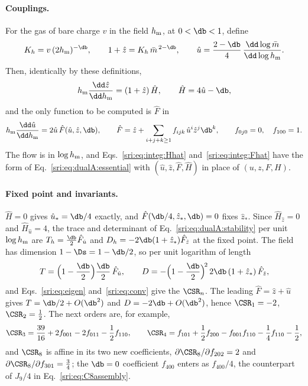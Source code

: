 \paragraph{Couplings.} For the gas of bare charge $v$ in the field $h_{\rm m}$, at $0<\db<1$, define
\begin{equation}
 K_h=v\,(2h_{\rm m})^{-\db},\qquad 1+\hat z=K_h\,\bar m^{\,2-\db},\qquad
 \hat u=\frac{2-\db}{4}\,\frac{\dd\log\bar m}{\dd\log h_{\rm m}} .
 \label{sri:eq:integ:couplings}
\end{equation}
Then, identically by these definitions,
\begin{equation}
 h_{\rm m}\frac{\dd\hat z}{\dd h_{\rm m}}=(1+\hat z)\,\hat H,\qquad \hat H=4\hat u-\db,
 \label{sri:eq:integ:Hhat}
\end{equation}
and the only function to be computed is $\hat F$ in
\begin{equation}
 h_{\rm m}\frac{\dd\hat u}{\dd h_{\rm m}}=2\hat u\,\hat F(\hat u,\hat z,\db),\qquad
 \hat F=\hat z+\sum_{i+j+k\ge1}f_{ijk}\,\hat u^i\hat z^j\db^k,\qquad f_{0j0}=0,\quad f_{100}=1 .
 \label{sri:eq:integ:Fhat}
\end{equation}
The flow is in $\log h_{\rm m}$, and Eqs.~\eqref{sri:eq:integ:Hhat} and~\eqref{sri:eq:integ:Fhat} have the form of
Eq.~\eqref{sri:eq:dualA:essential} with $(\hat u,\hat z,\hat F,\hat H)$ in place of $(u,z,F,H)$.

\paragraph{Fixed point and invariants.} $\hat H=0$ gives $\hat u_*=\db/4$ exactly, and $\hat F(\db/4,\hat z_*,\db)=0$
fixes $\hat z_*$. Since $\hat H_{\hat z}=0$ and $\hat H_{\hat u}=4$, the trace and determinant of
Eq.~\eqref{sri:eq:dualA:stability} per unit $\log h_{\rm m}$ are $T_h=\frac\db2\hat F_{\hat u}$ and
$D_h=-2\db(1+\hat z_*)\hat F_{\hat z}$ at the fixed point. The field has dimension $1-\Ds=1-\db/2$, so per unit
logarithm of length
\begin{equation}
 T=\Bigl(1-\frac\db2\Bigr)\frac\db2\,\hat F_{\hat u},\qquad
 D=-\Bigl(1-\frac\db2\Bigr)^{\!2}\,2\db\,(1+\hat z_*)\,\hat F_{\hat z},
 \label{sri:eq:integ:TD}
\end{equation}
and Eqs.~\eqref{sri:eq:eigen} and~\eqref{sri:eq:conv} give the $\CSR_n$. The leading $\hat F=\hat z+\hat u$ gives
$T=\db/2+O(\db^2)$ and $D=-2\db+O(\db^2)$, hence $\CSR_1=-2$, $\CSR_2=\frac12$. The next orders are, for example,
\begin{equation}
 \CSR_3=\frac{39}{16}+2f_{001}-2f_{011}-\frac12f_{110},\qquad
 \CSR_4=f_{101}+\frac12f_{200}-f_{001}f_{110}-\frac14f_{110}-\frac12,
\end{equation}
and $\CSR_8$ is affine in its two new coefficients, $\partial\CSR_8/\partial f_{202}=2$ and $\partial\CSR_8/\partial
f_{301}=\frac34$; the $\db=0$ coefficient $f_{400}$ enters as $f_{400}/4$, the counterpart of $J_9/4$ in
Eq.~\eqref{sri:eq:C8assembly}.

